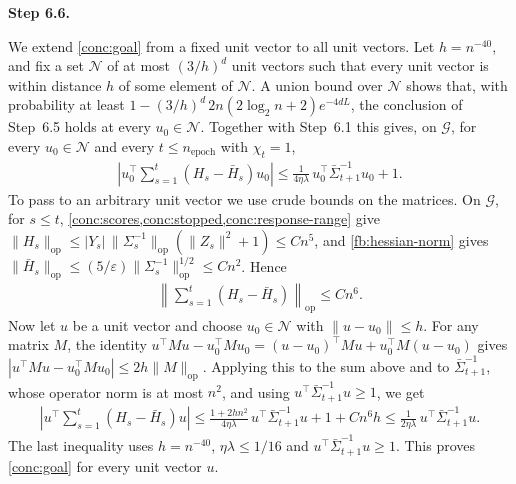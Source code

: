 \documentclass[12pt,cleveref]{jmlr}
\renewenvironment{proof}[1][\proofname]
{\par\noindent{\bfseries\upshape #1\ }}
{\jmlrQED}
\newcommand{\proofstepinline}[1]{%
    \par\addvspace{0.6\baselineskip}
    \noindent
    {\normalfont\normalsize\bfseries\color{blue!55!black}Step #1.}\enspace\ignorespaces
}
\newcommand{\op}{\mathrm{op}}
\newcommand{\1}{\mathbf 1}
\newcommand{\eps}{\varepsilon}
\begin{document}
\begin{proof}[Proof of \cref{conc:uniform}]
    \proofstepinline{6.6}
    We extend \cref{conc:goal} from a fixed unit vector to all unit vectors.
    Let $h=n^{-40}$, and fix a set $\mathcal N$ of at most $(3/h)^d$ unit
    vectors such that every unit vector is within distance $h$ of some
    element of $\mathcal N$. A union bound over $\mathcal N$ shows that,
    with probability at least $1-(3/h)^d\,2n(2\log_2n+2)e^{-4dL}$, the
    conclusion of Step~6.5 holds at every $u_0\in\mathcal N$. Together with
    Step~6.1 this gives, on $\mathcal G$, for every $u_0\in\mathcal N$ and
    every $t\leq n_{\mathrm{epoch}}$ with $\chi_t=1$,
    \begin{align}
        \left|u_0^\top\sum_{s=1}^t(H_s-\bar H_s)u_0\right|
        \leq\frac{1}{4\eta\lambda}\,u_0^\top\bar\Sigma_{t+1}^{-1}u_0+1.
    \end{align}
    To pass to an arbitrary unit vector we use crude bounds on the
    matrices. On $\mathcal G$, for $s\leq t$,
    \cref{conc:scores,conc:stopped,conc:response-range} give
    $\|H_s\|_{\op}\leq|Y_s|\,\|\Sigma_s^{-1}\|_{\op}(\|Z_s\|^2+1)\leq Cn^5$,
    and \cref{fb:hessian-norm} gives
    $\|\bar H_s\|_{\op}\leq(5/\eps)\|\Sigma_s^{-1}\|_{\op}^{1/2}\leq Cn^2$.
    Hence
    \begin{align}
        \left\|\sum_{s=1}^t(H_s-\bar H_s)\right\|_{\op}\leq Cn^6.
    \end{align}
    Now let $u$ be a unit vector and choose $u_0\in\mathcal N$ with
    $\|u-u_0\|\leq h$. For any matrix $M$, the identity
    $u^\top Mu-u_0^\top Mu_0=(u-u_0)^\top Mu+u_0^\top M(u-u_0)$ gives
    $|u^\top Mu-u_0^\top Mu_0|\leq2h\|M\|_{\op}$. Applying this to the sum
    above and to $\bar\Sigma_{t+1}^{-1}$, whose operator norm is at most
    $n^2$, and using $u^\top\bar\Sigma_{t+1}^{-1}u\geq1$, we get
    \begin{align}
        \left|u^\top\sum_{s=1}^t(H_s-\bar H_s)u\right|
        \leq\frac{1+2hn^2}{4\eta\lambda}\,u^\top\bar\Sigma_{t+1}^{-1}u
        +1+Cn^6h
        \leq\frac{1}{2\eta\lambda}\,u^\top\bar\Sigma_{t+1}^{-1}u.
    \end{align}
    The last inequality uses $h=n^{-40}$, $\eta\lambda\leq1/16$ and
    $u^\top\bar\Sigma_{t+1}^{-1}u\geq1$. This proves \cref{conc:goal} for
    every unit vector $u$.


\end{proof}
\end{document}
